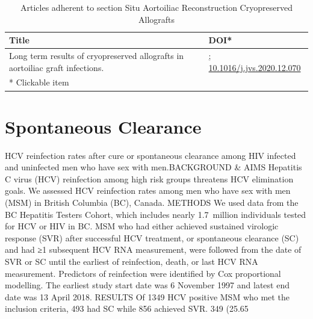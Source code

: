 \documentclass{qqtarticle}
\begin{document}
        \begin{table}[H]
        \scriptsize
        \centering
        \caption{Articles adherent to section Situ Aortoiliac Reconstruction Cryopreserved Allografts}
        \renewcommand{\arraystretch}{1.5}
        \begin{tabular}{p{}l}
            \toprule 
            Title & DOI* \\     \midrule Long term results of cryopreserved allografts in aortoiliac graft infections. \cite{Longterm77108372} & \href{https://dx.doi.org/; 10.1016/j.jvs.2020.12.070}{; 10.1016/j.jvs.2020.12.070}\\     \midrule
            * Clickable item \\
            \bottomrule
        \end{tabular}
        \label{tab:topic13}
        \end{table}\section{Spontaneous Clearance}
            HCV reinfection rates after cure or spontaneous clearance among HIV infected and uninfected men who have sex with men.BACKGROUND & AIMS  Hepatitis C virus (HCV) reinfection among high risk groups threatens HCV elimination goals. We assessed HCV reinfection rates among men who have sex with men (MSM) in British Columbia (BC), Canada. METHODS  We used data from the BC Hepatitis Testers Cohort, which includes nearly 1.7 million individuals tested for HCV or HIV in BC. MSM who had either achieved sustained virologic response (SVR) after successful HCV treatment, or spontaneous clearance (SC) and had ≥1 subsequent HCV RNA measurement, were followed from the date of SVR or SC until the earliest of reinfection, death, or last HCV RNA measurement. Predictors of reinfection were identified by Cox proportional modelling. The earliest study start date was 6 November 1997 and latest end date was 13 April 2018. RESULTS  Of 1349 HCV positive MSM who met the inclusion criteria, 493 had SC while 856 achieved SVR. 349 (25.65%
\end{document}
